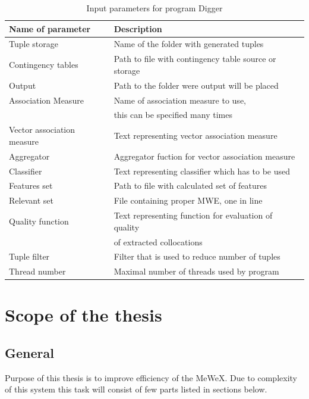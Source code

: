 \begin{table}[t]
    \centering
    \begin{tabular*}{0.9\textwidth}{|l @{\extracolsep{\fill}} l|}
        \hline 
        \textbf{Name of parameter} & \textbf{Description} \\
        \hline
        Tuple storage & Name of the folder with generated tuples \\
        \hline
        Contingency tables & Path to file with contingency table source or storage \\
        \hline
        Output & Path to the folder were output will be placed \\
        \hline
        Association Measure & Name of association measure to use, \\& this can be specified many times \\
        \hline
        Vector association measure & Text representing vector association measure \\
        \hline
        Aggregator & Aggregator fuction for vector association measure \\
        \hline
        Classifier & Text representing classifier which has to be used \\
        \hline
        Features set & Path to file with calculated set of features \\
        \hline
        Relevant set & File containing proper MWE, one in line \\
        \hline
        Quality function & Text representing function for evaluation of quality \\& of extracted collocations \\
        \hline
        Tuple filter & Filter that is used to reduce number of tuples \\
        \hline
        Thread number & Maximal number of threads used by program \\
        \hline
    \end{tabular*} 
    \caption{Input parameters for program Digger}
    \label{tbl_workflow2}
\end{table}

\section{Scope of the thesis}

\subsection{General}
Purpose of this thesis is to improve efficiency of the MeWeX. Due to complexity of this system this task 
will consist of few parts listed in sections below.

